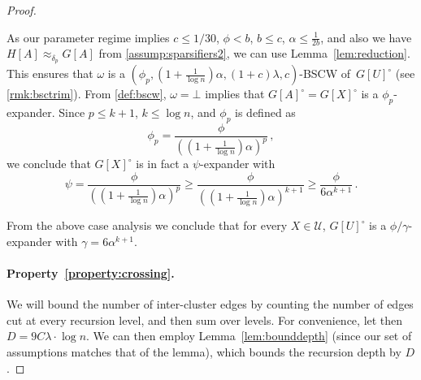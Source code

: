 \begin{proof}
\begin{itemize}
		As our parameter regime implies $c \le 1/30$, $\phi < b$, $b \le c$, $\alpha \le \frac{1}{2b}$, and also we have $H[A] \approx_{\delta_p} G[A]$ from  \cref{assump:sparsifiers2}, we can use Lemma~\ref{lem:reduction}. This ensures that $\omega$ is a $(\phi_p,(1+\frac{1}{\log n})\alpha,(1+c)\lambda, c)$-BSCW of~$G[U]^\circ$ (see \cref{rmk:bsctrim}). From \cref{def:bscw}, $\omega=\bot$ implies that $G[A]^\circ=G[X]^\circ$ is a $\phi_p$-expander. Since $p \le k+1$, $k \le \log n$, and $\phi_p$ is defined as
		\begin{equation*}
			\phi_p = \frac{\phi}{\left(\left(1+\frac{1}{\log n}\right)\alpha\right)^p} \, ,
		\end{equation*}
		we conclude that $G[X]^\circ$ is in fact a $\psi$-expander with
		\begin{equation*}
			\psi = \frac{\phi}{\left(\left(1+\frac{1}{\log n}\right)\alpha\right)^p}  \ge \frac{\phi}{\left(\left(1+\frac{1}{\log n}\right)\alpha\right)^{k+1}} \ge \frac{\phi}{6\alpha^{k+1}} \, . 
		\end{equation*}
	\end{itemize}
	From the above case analysis we conclude that for every $X \in\mathcal{U}$, $G[U]^\circ$ is a $\phi/\gamma$-expander with $\gamma = 6 \alpha^{k+1}$.
	
	\paragraph{Property~\eqref{property:crossing}.} We will bound the number of inter-cluster edges by counting the number of edges cut at every recursion level, and then sum over levels. For convenience, let then $D=9C\lambda \cdot \log n$. We can then employ Lemma~\ref{lem:bounddepth} (since our set of assumptions matches that of the lemma), which bounds the recursion depth by $D$.
	

\end{proof}
